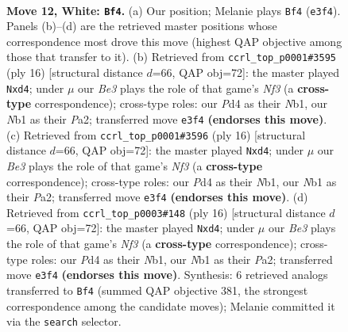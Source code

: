 \documentclass[11pt]{article}
\begin{document}
\clearpage

\begin{figure}[p]\centering
\begin{subfigure}{0.46\textwidth}\centering
\resizebox{\linewidth}{!}{%
\newchessgame
\chessboard[
  setfen={rnbqr2k/p5pp/2pb1n2/1p1p1p2/3P4/4BNP1/PPQ1PPBP/RN3RK1 w - - 4 12},
  showmover=false,
  pgfstyle=straightmove, color=movearrow, markmove={e3-f4}
]}
\caption{}
\end{subfigure}\hfill
\begin{subfigure}{0.46\textwidth}\centering
\resizebox{\linewidth}{!}{%
\newchessgame
\chessboard[
  setfen={rnq1kb1r/pb1p1ppp/1p2pn2/8/Q1Pp1B2/5NP1/PP2PPBP/RN3RK1 w kq - 0 9},
  showmover=false,
  pgfstyle=straightmove, color=movearrow, markmove={f3-d4}
]}
\caption{}
\end{subfigure}
\\[4pt]
\begin{subfigure}{0.46\textwidth}\centering
\resizebox{\linewidth}{!}{%
\newchessgame
\chessboard[
  setfen={rnq1kb1r/pb1p1ppp/1p2pn2/8/Q1Pp1B2/5NP1/PP2PPBP/RN3RK1 w kq - 0 9},
  showmover=false,
  pgfstyle=straightmove, color=movearrow, markmove={f3-d4}
]}
\caption{}
\end{subfigure}\hfill
\begin{subfigure}{0.46\textwidth}\centering
\resizebox{\linewidth}{!}{%
\newchessgame
\chessboard[
  setfen={rnq1kb1r/pb1p1ppp/1p2pn2/8/Q1Pp1B2/5NP1/PP2PPBP/RN3RK1 w kq - 0 9},
  showmover=false,
  pgfstyle=straightmove, color=movearrow, markmove={f3-d4}
]}
\caption{}
\end{subfigure}
\caption{\textbf{Move 12, White: \texttt{Bf4}.} (a) Our position; Melanie plays \texttt{Bf4} (\texttt{e3f4}). Panels (b)--(d) are the retrieved master positions whose correspondence most drove this move (highest QAP objective among those that transfer to it). (b) Retrieved from \texttt{ccrl\_top\_p0001\#3595} (ply 16) [structural distance $d$=66, QAP obj=72]: the master played \texttt{Nxd4}; under $\mu$ our \emph{Be3} plays the role of that game's \emph{Nf3} (a \textbf{cross-type} correspondence); cross-type roles: our \emph{P}d4 as their \emph{N}b1, our \emph{N}b1 as their \emph{P}a2; transferred move \texttt{e3f4} \textbf{(endorses this move)}. (c) Retrieved from \texttt{ccrl\_top\_p0001\#3596} (ply 16) [structural distance $d$=66, QAP obj=72]: the master played \texttt{Nxd4}; under $\mu$ our \emph{Be3} plays the role of that game's \emph{Nf3} (a \textbf{cross-type} correspondence); cross-type roles: our \emph{P}d4 as their \emph{N}b1, our \emph{N}b1 as their \emph{P}a2; transferred move \texttt{e3f4} \textbf{(endorses this move)}. (d) Retrieved from \texttt{ccrl\_top\_p0003\#148} (ply 16) [structural distance $d$=66, QAP obj=72]: the master played \texttt{Nxd4}; under $\mu$ our \emph{Be3} plays the role of that game's \emph{Nf3} (a \textbf{cross-type} correspondence); cross-type roles: our \emph{P}d4 as their \emph{N}b1, our \emph{N}b1 as their \emph{P}a2; transferred move \texttt{e3f4} \textbf{(endorses this move)}. Synthesis: 6 retrieved analogs transferred to \texttt{Bf4} (summed QAP objective 381, the strongest correspondence among the candidate moves); Melanie committed it via the \texttt{search} selector.}
\label{fig:thought-m22}
\end{figure}
\end{document}
